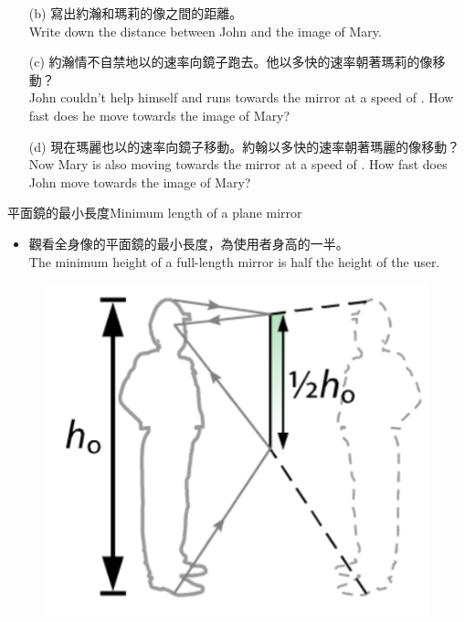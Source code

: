 \documentclass[beamer=true]{standalone}
\begin{document}
\begin{eg}
    \begin{itemize}
        \item [(b)] 寫出約瀚和瑪莉的像之間的距離。\\Write down the distance between John and the image of Mary.\vspace{0.8cm}
        \item [(c)] 約瀚情不自禁地以的速率向鏡子跑去。他以多快的速率朝著瑪莉的像移動？\\John couldn't help himself and runs towards the mirror at a speed of . How fast does he move towards the image of Mary?\vspace{0.8cm}
        \item [(d)] 現在瑪麗也以的速率向鏡子移動。約翰以多快的速率朝著瑪麗的像移動？\\Now Mary is also moving towards the mirror at a speed of . How fast does John move towards the image of Mary?
    \end{itemize}

\end{eg}




\begin{frame}{平面鏡的最小長度Minimum length of a plane mirror}
\begin{itemize}
    \item 觀看全身像的平面鏡的最小長度，為使用者身高的一半。\\The minimum height of a full-length mirror is half the height of the user.
\end{itemize}
\begin{figure}
    \centering
    \includegraphics[width=0.4\linewidth]{assets/dq1e1.png}
\end{figure}
\end{frame}
\end{document}
